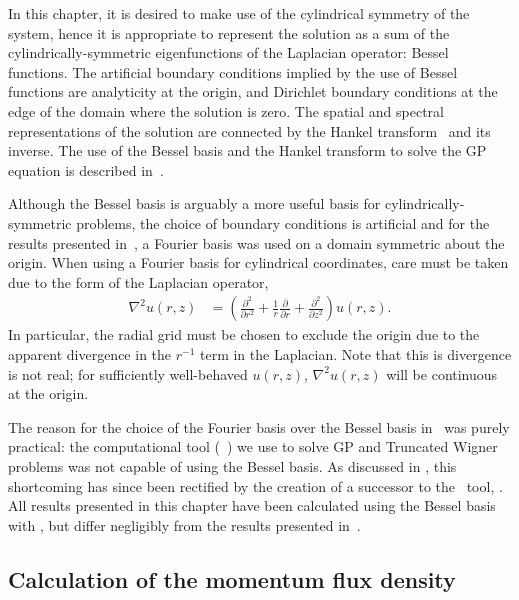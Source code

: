 In this chapter, it is desired to make use of the cylindrical symmetry of the system, hence it is appropriate to represent the solution as a sum of the cylindrically-symmetric eigenfunctions of the Laplacian operator: Bessel functions. The artificial boundary conditions implied by the use of Bessel functions are analyticity at the origin, and Dirichlet boundary conditions at the edge of the domain where the solution is zero. The spatial and spectral representations of the solution are connected by the Hankel transform~\citep[Chapter 15]{ArfkenWeber} and its inverse. The use of the Bessel basis and the Hankel transform to solve the GP equation is described in~\citep{Ronen:2006}.

Although the Bessel basis is arguably a more useful basis for cylindrically-symmetric problems, the choice of boundary conditions is artificial and for the results presented in~\citep{Dall:2009}, a Fourier basis was used on a domain symmetric about the origin. When using a Fourier basis for cylindrical coordinates, care must be taken due to the form of the Laplacian operator,
\begin{align}
    \nabla^2 u(r, z) &= \left(\frac{\partial^2 }{\partial r^2} + \frac{1}{r}\frac{\partial }{\partial r} + \frac{\partial^2 }{\partial z^2}\right)u(r, z).
\end{align}
In particular, the radial grid must be chosen to exclude the origin due to the apparent divergence in the $r^{-1}$ term in the Laplacian. Note that this is divergence is not real; for sufficiently well-behaved $u(r, z)$, $\nabla^2 u(r, z)$ will be continuous at the origin.

The reason for the choice of the Fourier basis over the Bessel basis in~\citep{Dall:2009} was purely practical: the computational tool (\XMDS\ \citep{Collecutt:2001}) we use to solve GP and Truncated Wigner problems was not capable of using the Bessel basis.  As discussed in , this shortcoming has since been rectified by the creation of a successor to the \XMDS\ tool, \xpdeint.  All results presented in this chapter have been calculated using the Bessel basis with \xpdeint, but differ negligibly from the results presented in~\citep{Dall:2009}.

\subsection{Calculation of the momentum flux density}
\label{Peaks:AbsorbingBoundaryTricks}

